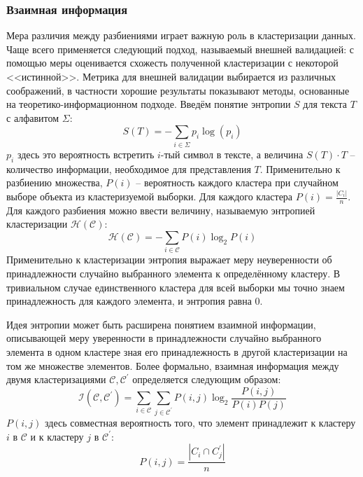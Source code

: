 \subsubsection{Взаимная информация}
Мера различия между разбиениями играет важную роль в кластеризации данных. Чаще всего применяется следующий подход, называемый внешней валидацией: с помощью меры оценивается схожесть полученной кластеризации с некоторой <<истинной>>. Метрика для внешней валидации выбирается из различных соображений, в частности хорошие результаты показывают методы, основанные на теоретико-информационном подходе\cite{vinh2010information}. Введём понятие энтропии $S$ для текста $T$ с алфавитом $\Sigma$:
\begin{equation}
	S(T) = -\sum_{i \in \Sigma} p_i \log(p_i) 
\end{equation}
$p_i$ здесь это вероятность встретить $i$-тый символ в тексте, а величина $S(T) \cdot T$ -- количество информации, необходимое для представления $T$. Применительно к разбиению множества, $P(i)$ -- вероятность каждого кластера при случайном выборе объекта из кластеризуемой выборки. Для каждого кластера $P(i) = \frac{|C_i|}{n}$. Для каждого разбиения можно ввести величину, называемую энтропией кластеризации $\mathcal{H}(\mathcal{C})$:
\begin{equation}
	\mathcal{H}(\mathcal{C}) = - \sum_{i \in \mathcal{C}} P(i) \log_2P(i)
\end{equation}
Применительно к кластеризации энтропия выражает меру неуверенности об принадлежности случайно выбранного элемента к определённому кластеру. В тривиальном случае единственного кластера для всей выборки мы точно знаем принадлежность для каждого элемента, и энтропия равна 0.

Идея энтропии может быть расширена понятием взаимной информации, описывающей меру уверенности в принадлежности случайно выбранного элемента в одном кластере зная его принадлежность в другой кластеризации на том же множестве элементов. Более формально, взаимная информация между двумя кластеризациями $\mathcal{C}, \mathcal{C}^\prime$ определяется следующим образом:
\begin{equation}
	\mathcal{I}(\mathcal{C}, \mathcal{C}^\prime) = \sum_{i \in \mathcal{C}} \sum_{j \in \mathcal{C}^\prime} P(i,j) \log_2 \frac{P(i,j)}{P(i)P(j)}
\end{equation} 
$P(i,j)$ здесь совместная вероятность того, что элемент принадлежит к кластеру $i$ в $\mathcal{C}$ и к кластеру $j$ в $\mathcal{C}^\prime$:
\begin{equation}
	P(i,j) = \frac{|C_i \cap C_j^\prime|}{n}
\end{equation}


